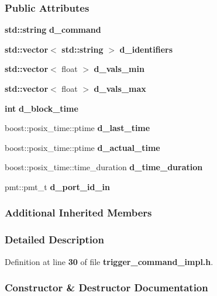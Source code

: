 \subsubsection*{Public Attributes}
\begin{DoxyCompactItemize}
\item 
{\bf std\+::string} {\bf d\+\_\+command}
\item 
{\bf std\+::vector}$<$ {\bf std\+::string} $>$ {\bf d\+\_\+identifiers}
\item 
{\bf std\+::vector}$<$ float $>$ {\bf d\+\_\+vals\+\_\+min}
\item 
{\bf std\+::vector}$<$ float $>$ {\bf d\+\_\+vals\+\_\+max}
\item 
{\bf int} {\bf d\+\_\+block\+\_\+time}
\item 
boost\+::posix\+\_\+time\+::ptime {\bf d\+\_\+last\+\_\+time}
\item 
boost\+::posix\+\_\+time\+::ptime {\bf d\+\_\+actual\+\_\+time}
\item 
boost\+::posix\+\_\+time\+::time\+\_\+duration {\bf d\+\_\+time\+\_\+duration}
\item 
pmt\+::pmt\+\_\+t {\bf d\+\_\+port\+\_\+id\+\_\+in}
\end{DoxyCompactItemize}
\subsubsection*{Additional Inherited Members}


\subsubsection{Detailed Description}


Definition at line {\bf 30} of file {\bf trigger\+\_\+command\+\_\+impl.\+h}.



\subsubsection{Constructor \& Destructor Documentation}
